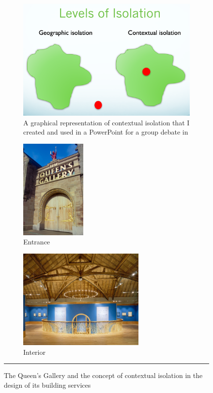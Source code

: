 \begin{figure}[htbp]
	\centering
	\begin{subfigure}[b]{0.5\textwidth}
		\includegraphics[width=\textwidth]{figures/isolation.png}
		\caption[Contextual isolation.]{A graphical representation of contextual isolation that I created and used in a PowerPoint for a group debate in \ID}\label{fig:isolation}
	\end{subfigure}
	
	\begin{subfigure}[b]{.48\textwidth}
		\centering
		\includegraphics[height=5cm]{figures/gallery-exterior.jpg}
		\caption{Entrance \citep{AboutTheQueensGallery}}\label{fig:qgexterior}
	\end{subfigure}
	\begin{subfigure}[b]{.48\textwidth}
		\centering
		\includegraphics[height=5cm]{figures/gallery-interior.jpg}
		\caption{Interior \citep{InsideTheGallery}}\label{fig:qginterior}
	\end{subfigure}
	\rule{\textwidth}{0.5pt} %
	\caption[The Queen's Gallery and the concept of contextual isolation.]{The Queen's Gallery and the concept of contextual isolation in the design of its building services}
	\label{fig:qg}
\end{figure}





